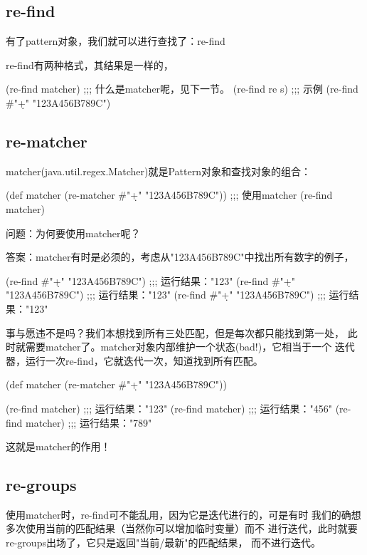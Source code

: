 \documentclass[a4paper,11pt]{article}
\begin{document}
  \subsection[re-find]{re-find}
  有了pattern对象，我们就可以进行查找了：re-find

  re-find有两种格式，其结果是一样的，

  \begin{schemecode}
(re-find matcher)
;;; 什么是matcher呢，见下一节。
(re-find re s)
;;; 示例
(re-find #"\d+" "123A456B789C")
  \end{schemecode}
  
  \subsection[re-matcher]{re-matcher}
  matcher(java.util.regex.Matcher)就是Pattern对象和查找对象的组合：

  \begin{schemecode}
(def matcher (re-matcher #"\d+" "123A456B789C"))
;;; 使用matcher
(re-find matcher)
  \end{schemecode}

  问题：为何要使用matcher呢？

  答案：matcher有时是必须的，考虑从"123A456B789C"中找出所有数字的例子，

  \begin{schemecode}
(re-find #"\d+" "123A456B789C")
;;; 运行结果："123"
(re-find #"\d+" "123A456B789C")
;;; 运行结果："123"
(re-find #"\d+" "123A456B789C")
;;; 运行结果："123"
  \end{schemecode}

  事与愿违不是吗？我们本想找到所有三处匹配，但是每次都只能找到第一处，
  此时就需要matcher了。matcher对象内部维护一个状态(bad!)，它相当于一个
  迭代器，运行一次re-find，它就迭代一次，知道找到所有匹配。

  \begin{schemecode}
(def matcher (re-matcher #"\d+" "123A456B789C"))

(re-find matcher)
;;; 运行结果："123"
(re-find matcher)
;;; 运行结果："456"
(re-find matcher)
;;; 运行结果："789"
  \end{schemecode}

  这就是matcher的作用！

  \subsection[re-groups]{re-groups}
  使用matcher时，re-find可不能乱用，因为它是迭代进行的，可是有时
  我们的确想多次使用当前的匹配结果（当然你可以增加临时变量）而不
  进行迭代，此时就要re-groups出场了，它只是返回"当前/最新"的匹配结果，
  而不进行迭代。
\end{document}
